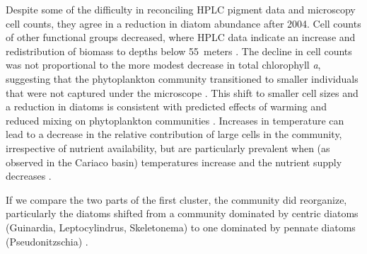 \documentclass[draft]{agujournal2019}
\begin{document}
Despite some of the difficulty in reconciling HPLC pigment data and microscopy cell counts, they agree in a reduction in diatom abundance after 2004. Cell counts of other functional groups decreased, where HPLC data indicate an increase and redistribution of biomass to depths below \qty{55}{meters} \cite{pinckney_phytoplankton_2015}. The decline in cell counts was not proportional to the more modest decrease in total chlorophyll \textit{a}, suggesting that the phytoplankton community transitioned to smaller individuals that were not captured under the microscope \cite{muller-karger_scientific_2019}. This shift to smaller cell sizes and a reduction in diatoms is consistent with predicted effects of warming and reduced mixing on phytoplankton communities \cite{bopp_response_2005}. Increases in temperature can lead to a decrease in the relative contribution of large cells in the community, irrespective of nutrient availability, but are particularly prevalent when (as observed in the Cariaco basin) temperatures increase and the nutrient supply decreases \cite{mousing_global_2014}. 

If we compare the two parts of the first cluster, the community did reorganize, particularly the diatoms shifted from a community dominated by centric diatoms (Guinardia, Leptocylindrus, Skeletonema) to one dominated by pennate diatoms (Pseudonitzschia) \cite{pinckney_phytoplankton_2015}.
\end{document}
